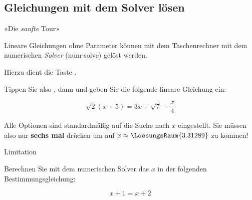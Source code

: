 
\subsection{Gleichungen mit dem Solver lösen}

«Die \textit{sanfte} Tour»

Lineare Gleichungen ohne Parameter können mit dem Taschenrechner mit dem numerischen
\textit{Solver} (num-solve) gelöst werden.

  Hierzu dient die Taste .

  Tippen Sie also , dann  und geben
  Sie die folgende lineare Gleichung ein:

$$\sqrt{2}(x+5) = 3x + \sqrt{7} - \frac{x}4$$

  Alle Optionen sind standardmäßig auf die Suche nach $x$
  eingestellt. Sie müssen also nur \textbf{sechs mal} 
  drücken um auf $x\approx \LoesungsRaum{3.31289}$ zu kommen!

  \begin{bemerkung}{Limitation}{}

    Berechnen Sie mit dem numerischen Solver
     das $x$ in der folgenden
    Bestimmungsgleichung:

    $$x+1=x+2$$
    

    \vspace{10mm}
    
    
  \end{bemerkung}


\newpage

